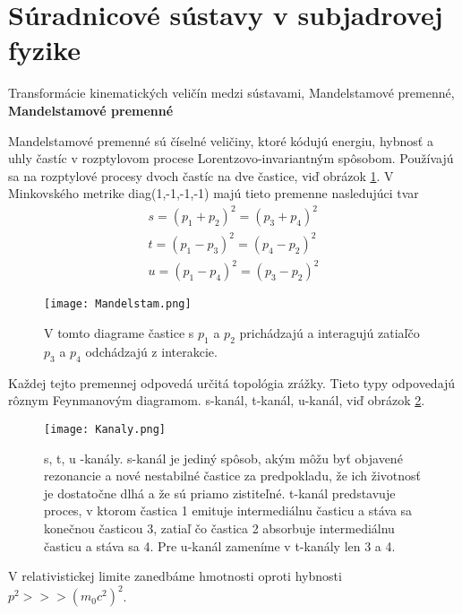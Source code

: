 \documentclass[../../main.tex]{subfiles}
\begin{document}
\section{Súradnicové sústavy v subjadrovej fyzike}
Transformácie kinematických veličín medzi sústavami, Mandelstamové premenné,\newline
\textbf{Mandelstamové premenné}\par
Mandelstamové premenné sú číselné veličiny, ktoré kódujú energiu, hybnosť a uhly častíc v rozptylovom procese Lorentzovo-invariantným spôsobom. Používajú sa na rozptylové procesy dvoch častíc na dve častice, viď obrázok \ref{sf1:fig:Mandelstam}. V Minkovského metrike diag(1,-1,-1,-1) majú tieto premenne nasledujúci tvar
\begin{equation}
\begin{gathered}
s=(p_1+p_2)^2=(p_3+p_4)^2 \\
t=(p_1-p_3)^2=(p_4-p_2)^2 \\
u=(p_1-p_4)^2=(p_3-p_2)^2
\end{gathered}
\end{equation}
\begin{figure}[!h]
\centering
\texttt{[image: Mandelstam.png]}
\caption{V tomto diagrame častice s $p_1$ a $p_2$ prichádzajú a interagujú zatiaľčo $p_3$ a $p_4$ odchádzajú z interakcie.}
\label{sf1:fig:Mandelstam}
\end{figure}
Každej tejto premennej odpovedá určitá topológia zrážky. Tieto typy odpovedajú rôznym Feynmanovým diagramom. s-kanál, t-kanál, u-kanál, viď obrázok \ref{sf1:fig:Kanaly}.
\begin{figure}[!h]
\centering
\texttt{[image: Kanaly.png]}
\caption{s, t, u -kanály. s-kanál je jediný spôsob, akým môžu byť objavené rezonancie a nové nestabilné častice za predpokladu, že ich životnosť je dostatočne dlhá a že sú priamo zistiteľné. t-kanál predstavuje proces, v ktorom častica 1 emituje intermediálnu časticu a stáva sa konečnou časticou 3, zatiaľ čo častica 2 absorbuje intermediálnu časticu a stáva sa 4. Pre u-kanál zameníme v t-kanály len 3 a 4. 
}
\label{sf1:fig:Kanaly}
\end{figure}
\newline
V relativistickej limite zanedbáme hmotnosti oproti hybnosti $p^2 >>> (m_0c^2)^2$.
\end{document}
